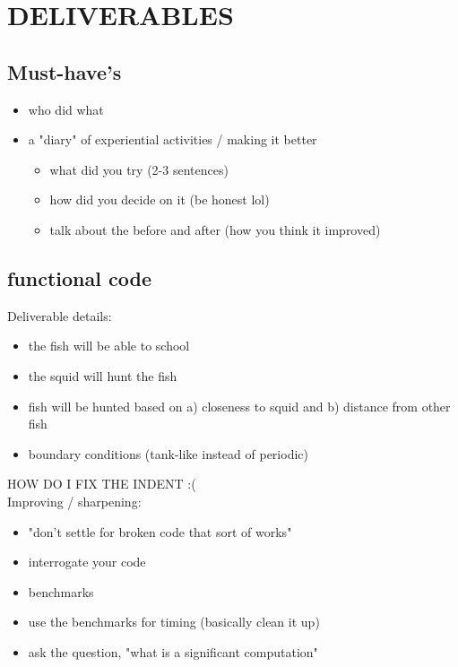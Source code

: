 \documentclass[12pt]{article}
\begin{document}
\section{DELIVERABLES}

\subsection{Must-have's}
\begin{itemize}
    \item who did what
    \item a "diary" of experiential activities / making it better
    \begin{itemize}
        \item what did you try (2-3 sentences)
        \item how did you decide on it (be honest lol)
        \item talk about the before and after (how you think it improved)
    \end{itemize}
\end{itemize}

\subsection{functional code}
Deliverable details:
    \begin{itemize}
        \item the fish will be able to school
        \item the squid will hunt the fish
        \item fish will be hunted based on a) closeness to squid and b) distance from other fish
        \item boundary conditions (tank-like instead of periodic)
    \end{itemize}

HOW DO I FIX THE INDENT :( \\
Improving / sharpening:
\begin{itemize}
    \item "don't settle for broken code that sort of works"
    \item interrogate your code
    \item benchmarks
    \item use the benchmarks for timing (basically clean it up)
    \item ask the question, "what is a significant computation"
\end{itemize}
\end{document}
